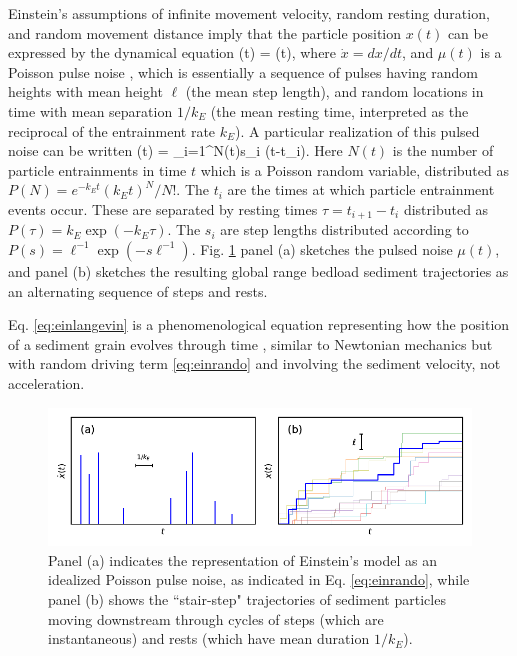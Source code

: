 Einstein's assumptions of infinite movement velocity, random resting duration, and random movement distance imply that the particle position $x(t)$ can be expressed by the dynamical equation
\be {}(t) = \mu(t), \label{eq:einlangevin}\ee
where $\dot{x} = dx/dt$, and $\mu(t)$ is a Poisson pulse noise \citep{VanDenBroeck1983}, which is essentially a sequence of pulses having random heights with mean height $\ell$ (the mean step length), and random locations in time with mean separation $1/k_E$ (the mean resting time, interpreted as the reciprocal of the entrainment rate $k_E$).
A particular realization of this pulsed noise can be written
\be \mu(t) = \sum_{i=1}^{N(t)}s_i \delta(t-t_i). \label{eq:einrando} \ee
Here $N(t)$ is the number of particle entrainments in time $t$ which is a Poisson random variable, distributed as $P(N) = e^{-k_E t} (k_E t)^N/N!$. The $t_i$ are the times at which particle entrainment events occur. These are separated by resting times $\tau = t_{i+1}-t_i$ distributed as $P(\tau) = k_E\exp(-k_E \tau)$. The $s_i$ are step lengths distributed according to $P(s) = \ell^{-1}\exp(-s \ell^{-1}).$
Fig. \ref{fig:einsteinfig} panel (a) sketches the pulsed noise $\mu(t)$, and panel (b) sketches the resulting global range bedload sediment trajectories as an alternating sequence of steps and rests.

Eq. \ref{eq:einlangevin} is a phenomenological equation representing how the position of a sediment grain evolves through time \citep{Kubo1978}, similar to Newtonian mechanics \citep{Goldstein1997} but with random driving term \ref{eq:einrando} and involving the sediment velocity, not acceleration.
\begin{figure}[!htbp]
	\includegraphics[width=\linewidth,keepaspectratio]{./figures/ch1/einsteinConcept.pdf}
	\caption{Panel (a) indicates the representation of Einstein's model as an idealized Poisson pulse noise, as indicated in Eq. \ref{eq:einrando}, while panel (b) shows the ``stair-step" trajectories of sediment particles moving downstream through cycles of steps (which are instantaneous) and rests (which have mean duration $1/k_E$). }
	\label{fig:einsteinfig}
\end{figure}

